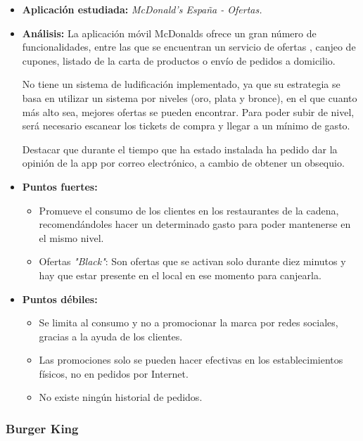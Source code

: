 \documentclass[twoside]{report}
\begin{document}
\begin{itemize}
\item \textbf{Aplicación estudiada:} \cite{mcdo} \textit{McDonald's España - Ofertas.}
\item \textbf{Análisis:} 
La aplicación móvil McDonalds ofrece un gran número de funcionalidades, entre las que se encuentran un servicio de ofertas , canjeo de cupones, listado de la carta de productos o envío de pedidos a domicilio. 

No tiene un sistema de ludificación implementado, ya que su estrategia se basa en utilizar un sistema por niveles (oro, plata y bronce), en el que cuanto más alto sea, mejores ofertas se pueden encontrar. Para poder subir de nivel, será necesario escanear los tickets de compra y llegar a un mínimo de gasto.

Destacar que durante el tiempo que ha estado instalada ha pedido dar la opinión de la app por correo electrónico, a cambio de obtener un obsequio.
\item \textbf{Puntos fuertes:}
	\begin{itemize}
	\item Promueve el consumo de los clientes en los restaurantes de la cadena, recomendándoles hacer un determinado gasto para poder mantenerse en el mismo nivel.
	\item Ofertas \textit{"Black"}: Son ofertas que se activan solo durante diez minutos y hay que estar presente en el local en ese momento para canjearla.
	\end{itemize}
\item \textbf{Puntos débiles:}
	\begin{itemize}
	\item Se limita al consumo y no a promocionar la marca por redes sociales, gracias a la ayuda de los clientes.
	\item Las promociones solo se pueden hacer efectivas en los establecimientos físicos, no en pedidos por Internet.
	\item No existe ningún historial de pedidos.
	\end{itemize}
\end{itemize}


\subsubsection{Burger King}
\end{document}
